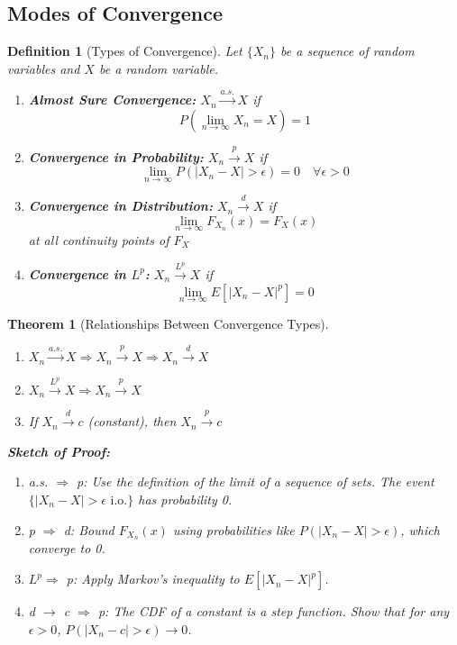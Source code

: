 \documentclass[12pt,a4paper]{article}
\newtheorem{theorem}{Theorem}[section]
\newtheorem{definition}{Definition}[section]
\theoremstyle{remark}
\begin{document}
\subsection{Modes of Convergence}

\begin{definition}[Types of Convergence]
Let $\{X_n\}$ be a sequence of random variables and $X$ be a random variable.

\begin{enumerate}
\item \textbf{Almost Sure Convergence:} $X_n \stackrel{a.s.}{\to} X$ if
   $$P(\lim_{n \to \infty} X_n = X) = 1$$

\item \textbf{Convergence in Probability:} $X_n \stackrel{p}{\to} X$ if
   $$\lim_{n \to \infty} P(|X_n - X| > \epsilon) = 0 \quad \forall \epsilon > 0$$

\item \textbf{Convergence in Distribution:} $X_n \stackrel{d}{\to} X$ if
   $$\lim_{n \to \infty} F_{X_n}(x) = F_X(x)$$
   at all continuity points of $F_X$

\item \textbf{Convergence in $L^p$:} $X_n \stackrel{L^p}{\to} X$ if
   $$\lim_{n \to \infty} E[|X_n - X|^p] = 0$$
\end{enumerate}
\end{definition}

\begin{theorem}[Relationships Between Convergence Types]
\begin{enumerate}
\item $X_n \stackrel{a.s.}{\to} X \Rightarrow X_n \stackrel{p}{\to} X \Rightarrow X_n \stackrel{d}{\to} X$
\item $X_n \stackrel{L^p}{\to} X \Rightarrow X_n \stackrel{p}{\to} X$
\item If $X_n \stackrel{d}{\to} c$ (constant), then $X_n \stackrel{p}{\to} c$
\end{enumerate}

\textbf{Sketch of Proof:}
\begin{enumerate}
\item \textit{a.s. $\Rightarrow$ p:} Use the definition of the limit of a sequence of sets. The event $\{|X_n - X| > \epsilon \text{ i.o.}\}$ has probability 0.
\item \textit{p $\Rightarrow$ d:} Bound $F_{X_n}(x)$ using probabilities like $P(|X_n - X| > \epsilon)$, which converge to 0.
\item \textit{$L^p \Rightarrow$ p:} Apply Markov's inequality to $E[|X_n - X|^p]$.
\item \textit{d $\to$ c $\Rightarrow$ p:} The CDF of a constant is a step function. Show that for any $\epsilon > 0$, $P(|X_n-c|>\epsilon) \to 0$.
\end{enumerate}
\end{theorem}
\end{document}
